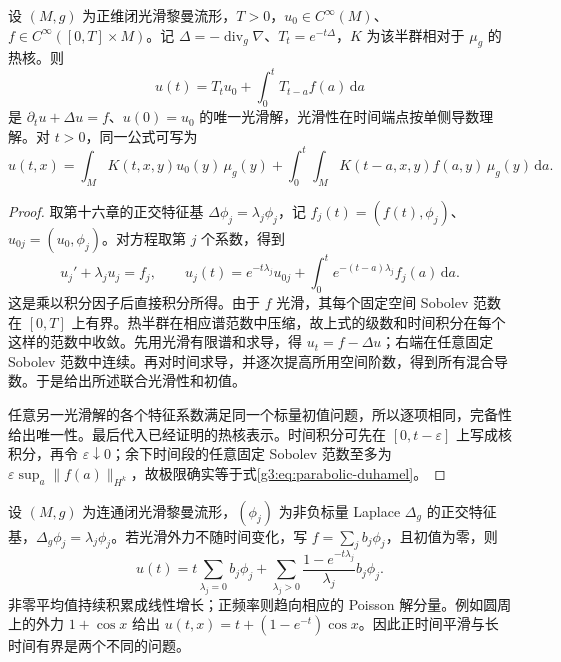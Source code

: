 \begin{proposition}[Duhamel 公式]\label{g3:prop:parabolic-duhamel}
	设 \((M,g)\) 为正维闭光滑黎曼流形，\(T>0\)，\(u_0\in C^\infty(M)\)、\(f\in C^\infty([0,T]\times M)\)。记 \(\Delta=-\operatorname{div}_g\nabla\)、\(T_t=e^{-t\Delta}\)，\(K\) 为该半群相对于 \(\mu_g\) 的热核。则
	\begin{equation}\label{g3:eq:parabolic-duhamel}
		u(t)=T_tu_0+\int_0^tT_{t-a}f(a)\,\mathrm da
	\end{equation}
	是 \(\partial_tu+\Delta u=f\)、\(u(0)=u_0\) 的唯一光滑解，光滑性在时间端点按单侧导数理解。对 \(t>0\)，同一公式可写为
	\[
		u(t,x)=\int_MK(t,x,y)u_0(y)\,\mu_g(y)
		+\int_0^t\int_MK(t-a,x,y)f(a,y)\,\mu_g(y)\,\mathrm da.
	\]
\end{proposition}
\begin{proof}
	取第十六章的正交特征基 \(\Delta\phi_j=\lambda_j\phi_j\)，记 \(f_j(t)=(f(t),\phi_j)\)、\(u_{0j}=(u_0,\phi_j)\)。对方程取第 \(j\) 个系数，得到
	\[
		u_j'+\lambda_ju_j=f_j,
		\qquad
		u_j(t)=e^{-t\lambda_j}u_{0j}
		+\int_0^te^{-(t-a)\lambda_j}f_j(a)\,\mathrm da.
	\]
	这是乘以积分因子后直接积分所得。由于 \(f\) 光滑，其每个固定空间 Sobolev 范数在 \([0,T]\) 上有界。热半群在相应谱范数中压缩，故上式的级数和时间积分在每个这样的范数中收敛。先用光滑有限谱和求导，得 \(u_t=f-\Delta u\)；右端在任意固定 Sobolev 范数中连续。再对时间求导，并逐次提高所用空间阶数，得到所有混合导数。于是给出所述联合光滑性和初值。

	任意另一光滑解的各个特征系数满足同一个标量初值问题，所以逐项相同，完备性给出唯一性。最后代入已经证明的热核表示。时间积分可先在 \([0,t-\varepsilon]\) 上写成核积分，再令 \(\varepsilon\downarrow0\)；余下时间段的任意固定 Sobolev 范数至多为 \(\varepsilon\sup_a\|f(a)\|_{H^k}\)，故极限确实等于式\eqref{g3:eq:parabolic-duhamel}。
\end{proof}

\begin{example}\label{g3:exm:heat-forcing-zero-mode}
	设 \((M,g)\) 为连通闭光滑黎曼流形，\((\phi_j)\) 为非负标量 Laplace \(\Delta_g\) 的正交特征基，\(\Delta_g\phi_j=\lambda_j\phi_j\)。若光滑外力不随时间变化，写 \(f=\sum_jb_j\phi_j\)，且初值为零，则
	\[
		u(t)=t\sum_{\lambda_j=0}b_j\phi_j
		+\sum_{\lambda_j>0}\frac{1-e^{-t\lambda_j}}{\lambda_j}b_j\phi_j.
	\]
	非零平均值持续积累成线性增长；正频率则趋向相应的 Poisson 解分量。例如圆周上的外力 \(1+\cos x\) 给出 \(u(t,x)=t+(1-e^{-t})\cos x\)。因此正时间平滑与长时间有界是两个不同的问题。
\end{example}

